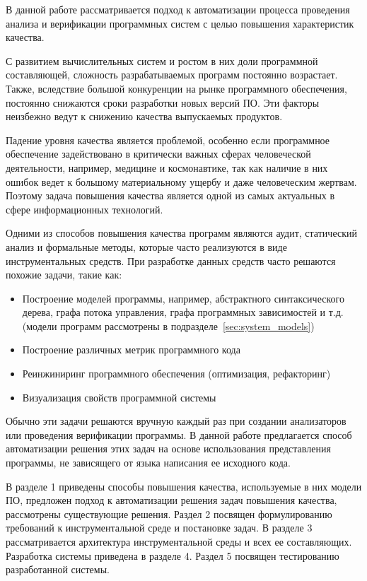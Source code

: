 \intro


В данной работе рассматривается подход к автоматизации процесса проведения
анализа и верификации программных систем с целью повышения характеристик
качества.

С развитием вычислительных систем и ростом в них доли программной составляющей,
сложность разрабатываемых программ постоянно возрастает. Также, вследствие
большой конкуренции на рынке программного обеспечения, постоянно снижаются сроки
разработки новых версий ПО. Эти факторы неизбежно ведут к снижению качества
выпускаемых продуктов.

Падение уровня качества является проблемой, особенно если программное
обеспечение задействовано в критически важных сферах человеческой деятельности,
например, медицине и космонавтике, так как наличие в них ошибок ведет к большому
материальному ущербу и даже человеческим жертвам. Поэтому задача повышения
качества является одной из самых актуальных в сфере информационных технологий.

Одними из способов повышения качества программ являются аудит, статический
анализ и формальные методы, которые часто реализуются в виде инструментальных
средств. При разработке данных средств часто решаются похожие задачи, такие
как:

\begin{itemize}
    \item Построение моделей программы, например, абстрактного синтаксического
    дерева, графа потока управления, графа программных зависимостей и т.д.
    (модели программ рассмотрены в подразделе~\ref{sec:system_models})
    \item Построение различных метрик программного кода
    \item Реинжиниринг программного обеспечения (оптимизация, рефакторинг)
    \item Визуализация свойств программной системы
\end{itemize}

Обычно эти задачи решаются вручную каждый раз при создании анализаторов или
проведения верификации программы. В данной работе предлагается способ
автоматизации решения этих задач на основе использования представления
программы, не зависящего от языка написания ее исходного кода.

В разделе 1 приведены способы повышения качества, используемые в них модели ПО,
предложен подход к автоматизации решения задач повышения качества, рассмотрены
существующие решения. Раздел 2 посвящен формулированию требований к
инструментальной среде и постановке задач. В разделе 3 рассматривается
архитектура инструментальной среды и всех ее составляющих. Разработка системы
приведена в разделе 4. Раздел 5 посвящен тестированию разработанной системы.
